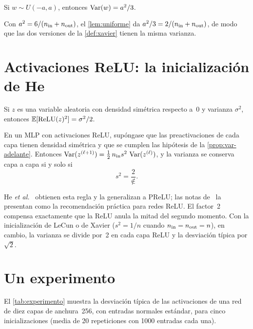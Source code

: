 \begin{lema}\label{lem:uniforme}
Si $w\sim U(-a,a)$, entonces $\operatorname{Var}(w)=a^{2}/3$.
\end{lema}

Con $a^{2}=6/(n_{\mathrm{in}}+n_{\mathrm{out}})$, el \cref{lem:uniforme} da $a^{2}/3=2/(n_{\mathrm{in}}+n_{\mathrm{out}})$, de modo que las dos versiones de la \cref{def:xavier} tienen la misma varianza.

\addtocounter{definicion}{1}%

\section{Activaciones ReLU: la inicialización de He}

\begin{lema}\label{lem:relu2}
Si $z$ es una variable aleatoria con densidad simétrica respecto a~0 y varianza $\sigma^{2}$, entonces $\mathbb{E}[\operatorname{ReLU}(z)^{2}]=\sigma^{2}/2$.
\end{lema}

\begin{teorema}[Inicialización de He]\label{teo:he}
En un MLP con activaciones ReLU, supóngase que las preactivaciones de cada capa tienen densidad simétrica y que se cumplen las hipótesis de la \cref{prop:var-adelante}. Entonces $\operatorname{Var}(z^{(\ell+1)})=\tfrac12\,n_{\mathrm{in}} s^{2}\,\operatorname{Var}(z^{(\ell)})$, y la varianza se conserva capa a capa si y solo si
\[
s^{2}=\frac{2}{\nin}.
\]
\end{teorema}

He \emph{et al.}~\cite{he} obtienen esta regla y la generalizan a PReLU; las notas de~\cite{cs231n} la presentan como la recomendación práctica para redes ReLU. El factor~2 compensa exactamente que la ReLU anula la mitad del segundo momento. Con la inicialización de LeCun o de Xavier ($s^{2}=1/n$ cuando $n_{\mathrm{in}}=n_{\mathrm{out}}=n$), en cambio, la varianza se divide por~2 en cada capa ReLU y la desviación típica por $\sqrt2$.

\addtocounter{definicion}{1}%

\section{Un experimento}

El \cref{tab:experimento} muestra la desviación típica de las activaciones de una red de diez capas de anchura~256, con entradas normales estándar, para cinco inicializaciones (media de 20 repeticiones con 1000 entradas cada una).

